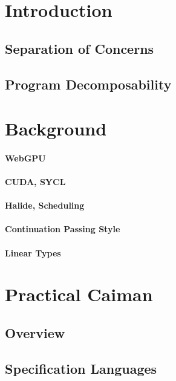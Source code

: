 \section{Introduction}

\subsection{Separation of Concerns}

\subsection{Program Decomposability}

\section{Background}

\paragraph{WebGPU}

\paragraph{CUDA, SYCL}

\paragraph{Halide, Scheduling}

\paragraph{Continuation Passing Style}

\paragraph{Linear Types}

\section{Practical Caiman}

\subsection{Overview}

\subsection{Specification Languages}


